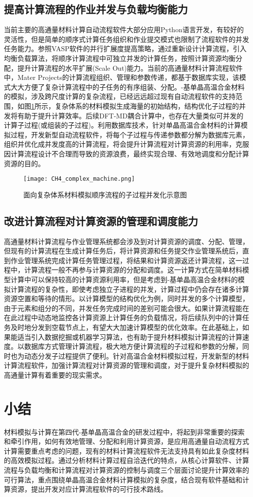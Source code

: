 \subsection{提高计算流程的作业并发与负载均衡能力}
当前主要的高通量材料计算自动流程软件大部分应用\textrm{Python}语言开发，有较好的灵活性，但是简单的顺序式计算任务组织和作业提交模式也限制了流程软件的并发任务能力。参照\textrm{VASP}软件的并行扩展度提高策略，通过重新设计计算流程，引入均衡负载算法，将顺序计算流程中可独立并发的计算任务，按照计算资源均衡分配，提升计算流程的水平扩展\textrm{(Scale Out)}能力。当前的高通量材料计算流程软件中，\textrm{Mater Projects}的计算流程组织、管理和参数传递，都基于数据库实现，该模式大大方便了复杂计算流程中的子任务的有序组装、分配。-基单晶高温合金材料的模拟，涉及跨尺度计算的复杂流程，已经远远超过现有自动流程软件的支持范围，如图\ref{CH4_comp_BCC}所示，复杂体系的材料模拟生成海量的初始结构，结构优化子过程的并发将有助于提升计算效率。后续\textrm{DFT-MD}耦合计算中，也存在大量类似可并发的计算子过程(或组装的子过程)。利用数据库技术，针对单晶高温合金材料的计算模拟过程，开发新型自动流程软件，将每个子过程与传递参数都分解为数据库元素，组织并优化成并发度高的计算流程，将会提升计算流程对计算资源的利用率，克服因计算流程设计不合理而导致的资源浪费，最终实现合理、有效地调度和分配计算资源的目的。
\begin{figure}[h!]
\centering
\vskip -2pt
\texttt{[image: CH4\_complex\_machine.png]}
\caption{面向复杂体系材料模拟顺序流程的子过程并发化示意图}%
\label{CH4_comp_BCC}
\end{figure}

\subsection{改进计算流程对计算资源的管理和调度能力}
高通量材料计算流程与作业管理系统都会涉及到对计算资源的调度、分配、管理，但现有的计算流程在生成计算任务后，将计算资源和任务提交作业管理系统后，直到作业管理系统完成计算任务管理过程，将结果和计算资源返还计算流程，这一过程中，计算流程一般不再参与计算资源的分配和调度。这一计算方式在简单材料模型计算中可以保持较高的计算资源利用率，但是考虑到-基单晶高温合金材料的模拟计算流程的复杂性，即使考虑独立子进程的并发，计算过程中仍会存在诸多计算资源空置和等待的情形。以计算模型的结构优化为例，同时并发的多个计算模型，由于元素和组分的不同，并发任务完成时间的差别可能会很大。如果计算流程能在在此过程中动态地监控各计算资源上计算任务的负载情况，将后续队列中的计算任务及时地分发到空载节点上，有望大大加速计算模型的优化效率。在此基础上，如果能适当引入数据挖掘或机器学习算法，也有助于提升材料模拟计算流程的计算速度。以数据库方式管理计算流程，极大地方便计算流程的子过程和参数的分解，同时也为动态分发子过程提供了便利。针对高温合金材料模拟过程，开发新型的材料计算流程软件，加强计算流程对计算资源的管理和调度，对于提升复杂材料模拟的高通量计算有着重要的现实需求。

\section{小结}
材料模拟与计算在第四代-基单晶高温合金的研发过程中，将起到非常重要的探索和牵引作用，如何有效地管理、分配和利用计算资源，是应用高通量自动流程方式计算需要重点考虑的问题，现有的材料计算流程软件无法支持具有如此复杂度材料的高效模拟过程。通过分析材料计算过程自洽迭代的特点，从核心计算软件、计算流程与负载均衡和计算流程对计算资源的控制与调度三个层面讨论提升计算效率的可行算法，重点围绕单晶高温合金材料计算模拟的复杂度，结合现有软件基础和计算资源，提出开发对应计算流程软件的可行技术路线。
